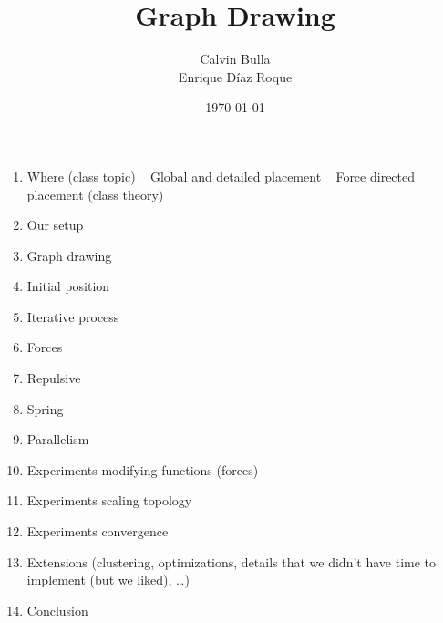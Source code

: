 \documentclass{beamer}
\title{Graph Drawing}
\date{\today}
\author{Calvin Bulla \\ Enrique Díaz Roque}
\institute{Algorithms for VSLI}
\begin{document}
\maketitle

\begin{frame}
\begin {enumerate}
\item Where (class topic) ~ Global and detailed placement ~ Force directed placement (class theory)
\item Our setup
\item Graph drawing
\item Initial position
\item Iterative process
\item Forces
\item Repulsive
\item Spring
\item Parallelism
\item Experiments modifying functions (forces)
\item Experiments scaling topology
\item Experiments convergence
\item Extensions (clustering, optimizations, details that we didn’t have time to implement (but we liked), …)
\item Conclusion
\end{enumerate}
\end{frame}
\end{document}
